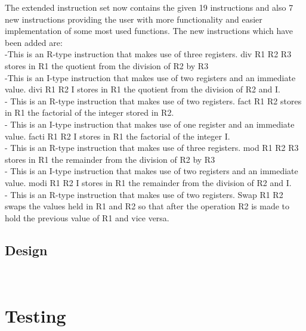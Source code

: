 \documentclass[12pt,a4paper,oneside]{report}
\begin{document}
The extended instruction set now contains the given 19 instructions and also 7 new instructions providing the user with more functionality and easier implementation of some most used functions. The new instructions which have been added are:\\
 -This is an R-type instruction that makes use of three registers.
div R1 R2 R3 stores in R1 the quotient from the division of R2 by R3\\
 -This is an I-type instruction that makes use of two registers and an immediate value. divi R1 R2 I stores in R1 the quotient from the division of R2 and I.\\
- This is an R-type instruction that makes use of two registers.
fact R1 R2 stores in R1 the factorial of the integer stored in R2. \\
- This is an I-type instruction that makes use of one register and an immediate value.
facti R1 R2 I stores in R1 the factorial of the integer I.\\
- This is an R-type instruction that makes use of three registers.
mod R1 R2 R3 stores in R1 the remainder from the division of R2 by R3\\
 - This is an I-type instruction that makes use of two registers and an immediate value.
modi R1 R2 I stores in R1 the remainder from the division of R2 and I.\\
 - This is an R-type instruction that makes use of two registers. Swap R1 R2 swaps the values held in R1 and R2 so that after the operation R2 is made to hold the previous value of R1 and vice versa.\\



\begin{center}
\section*  {Design}
\end{center}


\\



\section*{Testing}
\end{document}
